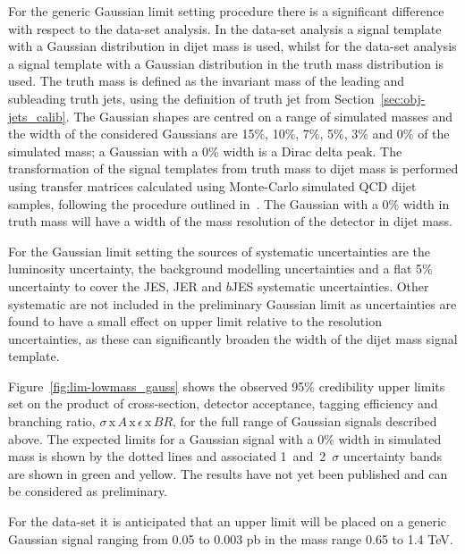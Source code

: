 For the generic Gaussian limit setting procedure there is a significant difference
with respect to the \summer{} data-set analysis.
In the \summer{} data-set analysis a signal template with a Gaussian distribution in dijet mass is used,
whilst for the \lm{} data-set analysis a signal template with a Gaussian distribution in the truth mass distribution is used.
The truth mass is defined as the invariant mass of the leading and subleading truth jets,
using the definition of truth jet from Section~\ref{sec:obj-jets_calib}.
The Gaussian shapes are centred on a range of simulated masses and the width of the considered Gaussians are
15\%, 10\%, 7\%, 5\%, 3\% and 0\% of the simulated mass;
a Gaussian with a 0\% width is a Dirac delta peak.
The transformation of the signal templates from truth mass to dijet mass is performed using
transfer matrices calculated using Monte-Carlo simulated QCD dijet samples,
following the procedure outlined in~\cite{dijet-mori17_paper}.
The Gaussian with a 0\% width in truth mass will have
a width of the mass resolution of the detector in dijet mass.

For the Gaussian limit setting the sources of systematic uncertainties
are the luminosity uncertainty,
the background modelling uncertainties and a flat 5\% uncertainty to cover
the JES, JER and $b$JES systematic uncertainties.
Other systematic are not included in the preliminary Gaussian limit
as uncertainties are found to have a small effect on upper limit relative to the resolution uncertainties,
as these can significantly broaden the width of the dijet mass signal template.

Figure~\ref{fig:lim-lowmass_gauss} shows the observed 95\% credibility upper limits set 
on the product of cross-section, detector acceptance, tagging efficiency and branching ratio,
$\sigma\,\text{x}\,\mathit{A}\,\text{x}\,\epsilon\,\text{x}\,\mathit{BR}$,
for the full range of Gaussian signals described above.
The expected limits for a Gaussian signal with a 0\% width
in simulated mass is shown by the dotted lines and associated 1~and~2~$\sigma$ uncertainty bands
are shown in green and yellow.
The results have not yet been published and can be considered as preliminary.

For the \lm{} data-set it is anticipated that an upper limit will be placed
on a generic Gaussian signal ranging from 0.05 to 0.003 pb in the mass range 0.65 to 1.4 TeV.

